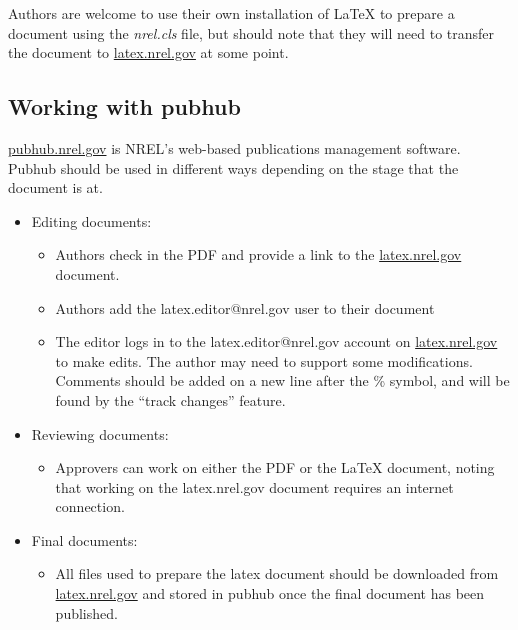 Authors are welcome to use their own installation of LaTeX to prepare a document using the \emph{nrel.cls} file, but should note that they will need to transfer the document to \href{latex.nrel.gov}{latex.nrel.gov} at some point.

\subsection{Working with pubhub}
\href{pubhub.nrel.gov}{pubhub.nrel.gov} is NREL's web-based publications management software. Pubhub should be used in different ways depending on the stage that the document is at.
\begin{itemize}
\item Editing documents: 
\begin{itemize} 
\item Authors check in the PDF and provide a link to the \href{latex.nrel.gov}{latex.nrel.gov} document.
\item Authors add the latex.editor@nrel.gov user to their document
\item The editor logs in to the latex.editor@nrel.gov account on \href{latex.nrel.gov}{latex.nrel.gov} to make edits. The author may need to support some modifications. Comments should be added on a new line after the \% symbol, and will be found by the ``track changes'' feature.
\end{itemize}
\item Reviewing documents:
\begin{itemize} 
\item Approvers can work on either the PDF or the LaTeX document, noting that working on the  latex.nrel.gov document requires an internet connection.
\end{itemize}
\item Final documents: 
\begin{itemize} 
\item All files used to prepare the latex document should be downloaded from \href{latex.nrel.gov}{latex.nrel.gov} and stored in pubhub once the final document has been published.
\end{itemize}
\end{itemize}

